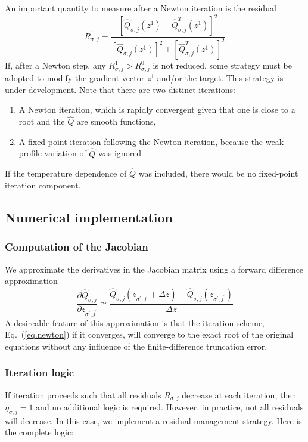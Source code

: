 \documentclass[12pt]{article}
\newcommand\qhat{\widehat{Q}}
\newcommand{\sj}{{\sigma,j}}
\newcommand{\spjp}{{\sigma^\prime,j^\prime}}
\begin{document}
%
An important quantity to measure after a Newton iteration is
the residual 
\begin{equation}
R^1_\sj = \frac{\left[\qhat_\sj(z^1)-\qhat^T_\sj(z^1)\right]^2}{
 \left[\qhat_\sj(z^1)\right]^2+\left[\qhat^T_\sj(z^1)\right]^2}
\end{equation}
%
If, after a Newton step, any $R^1_\sj > R^0_\sj$ is not 
reduced, some strategy must be adopted to modify the 
gradient vector $z^1$ and/or the target.  This strategy 
is under development.  Note that there are two distinct 
iterations: 
%
\begin{enumerate}
\item
A Newton iteration, which is rapidly convergent given 
that one is close to a root and the $\qhat$ are smooth 
functions, 
\item
A fixed-point iteration following the Newton iteration,
because the weak profile variation of $\qhat$ was 
ignored
\end{enumerate}
If the temperature dependence of $\qhat$ was included, there 
would be no fixed-point iteration component.

\subsection{Numerical implementation}

\subsubsection{Computation of the Jacobian}

We approximate the derivatives in the Jacobian 
matrix using a forward difference approximation
%
\begin{equation}
\frac{\partial \qhat_\sj}{\partial z_\spjp} \simeq 
\frac{\qhat_\sj (z_\spjp + \Delta z) -\qhat_\sj (z_\spjp)}{\Delta z} 
\end{equation}
%
A desireable feature of this approximation is that the 
iteration scheme, Eq.~(\ref{eq.newton}) if it converges, 
will converge to the exact root of the original equations 
without any influence of the finite-difference truncation 
error.

\subsubsection{Iteration logic}

If iteration proceeds such that all residuals $R_\sj$ 
decrease at each iteration, then $\eta_\sj = 1$ and no 
additional logic is required.  However, in practice, 
not all residuals will decrease.  In this case, we 
implement a residual management strategy.  Here is the
complete logic:
\end{document}
